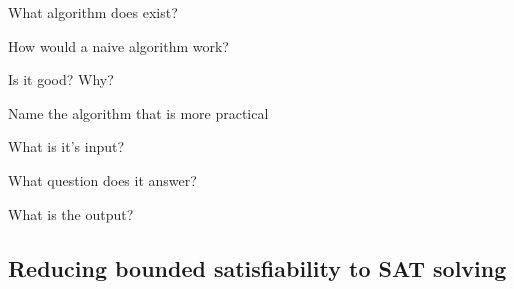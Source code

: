 \documentclass[fleqn]{article}
\begin{document}
\begin{enumerate}
    {\color{red}\item What algorithm does exist?}
    {\color{red}\item How would a naive algorithm work?}
    {\color{red}\item Is it good? Why?}
    \item Name the algorithm that is more practical
    \begin{itemize}
        {\color{red}\item What is it's input?}
        {\color{red}\item What question does it answer?}
        \item What is the output?
    \end{itemize}
\end{enumerate}

\subsection{Reducing bounded satisfiability to SAT solving}
\end{document}
